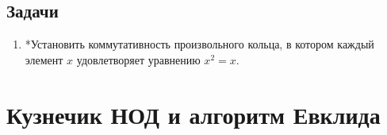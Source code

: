 \subsection*{Задачи}

\begin{enumerate}
\item *Установить коммутативность произвольного кольца, в котором каждый элемент $x$ удовлетворяет уравнению $x^2=x$.
\end{enumerate}

\section{Кузнечик НОД и алгоритм Евклида}\label{EVKL}



